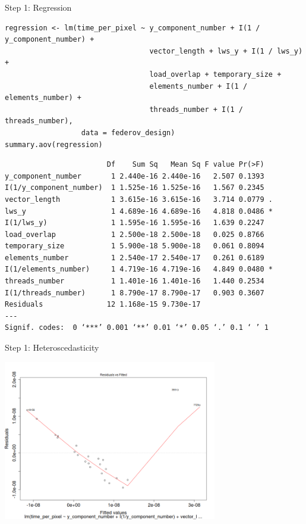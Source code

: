 \documentclass[10pt, compress, aspectratio=169, xcolor={table,usenames,dvipsnames}]{beamer}
\begin{document}
\begin{frame}[fragile,label={sec:orgc741d0a}]{Step 1: Regression}
 \scriptsize
\lstset{language=r,label= ,caption= ,captionpos=b,numbers=none}
\begin{lstlisting}
regression <- lm(time_per_pixel ~ y_component_number + I(1 / y_component_number) +
                                  vector_length + lws_y + I(1 / lws_y) +
                                  load_overlap + temporary_size +
                                  elements_number + I(1 / elements_number) +
                                  threads_number + I(1 / threads_number),
                  data = federov_design)
summary.aov(regression)
\end{lstlisting}

\begin{verbatim}
                        Df    Sum Sq   Mean Sq F value Pr(>F)
y_component_number       1 2.440e-16 2.440e-16   2.507 0.1393
I(1/y_component_number)  1 1.525e-16 1.525e-16   1.567 0.2345
vector_length            1 3.615e-16 3.615e-16   3.714 0.0779 .
lws_y                    1 4.689e-16 4.689e-16   4.818 0.0486 *
I(1/lws_y)               1 1.595e-16 1.595e-16   1.639 0.2247
load_overlap             1 2.500e-18 2.500e-18   0.025 0.8766
temporary_size           1 5.900e-18 5.900e-18   0.061 0.8094
elements_number          1 2.540e-17 2.540e-17   0.261 0.6189
I(1/elements_number)     1 4.719e-16 4.719e-16   4.849 0.0480 *
threads_number           1 1.401e-16 1.401e-16   1.440 0.2534
I(1/threads_number)      1 8.790e-17 8.790e-17   0.903 0.3607
Residuals               12 1.168e-15 9.730e-17
---
Signif. codes:  0 ‘***’ 0.001 ‘**’ 0.01 ‘*’ 0.05 ‘.’ 0.1 ‘ ’ 1
\end{verbatim}

\normalsize
\end{frame}

\begin{frame}[label={sec:org2379f06}]{Step 1: Heteroscedasticity}
\begin{center}
\includegraphics[width=0.7\textwidth]{../img/regression_before_transform.png}
\end{center}
\end{frame}
\end{document}
